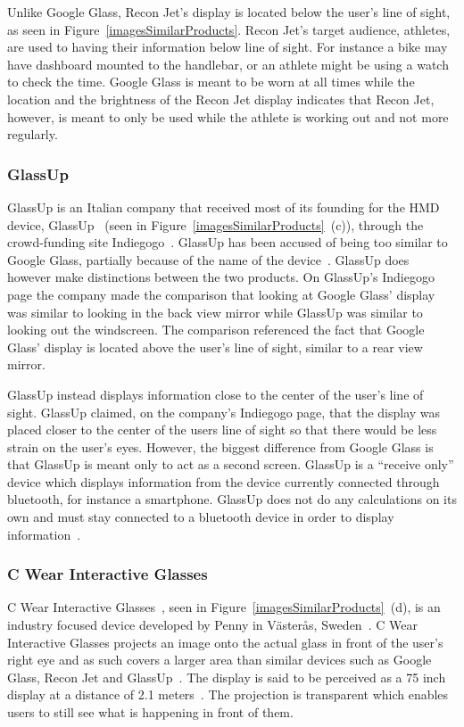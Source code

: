 Unlike Google Glass, Recon Jet's display is located below the user's line of sight, as seen in Figure~\ref{imagesSimilarProducts}. Recon Jet's target audience, athletes, are used to having their information below line of sight. For instance a bike may have dashboard mounted to the handlebar, or an athlete might be using a watch to check the time. Google Glass is meant to be worn at all times while the location and the brightness of the Recon Jet display indicates that Recon Jet, however, is meant to only be used while the athlete is working out and not more regularly.

\subsubsection{GlassUp}

GlassUp is an Italian company that received most of its founding for the HMD device, GlassUp~\cite{glassUp} (seen in Figure~\ref{imagesSimilarProducts}~(c)), through the crowd-funding site Indiegogo~\cite{glassUpIndiegogo}. GlassUp has been accused of being too similar to Google Glass, partially because of the name of the device~\cite{glassUpLegal}. GlassUp does however make distinctions between the two products. On GlassUp's Indiegogo page the company made the comparison that looking at Google Glass' display was similar to looking in the back view mirror while GlassUp was similar to looking out the windscreen. The comparison referenced the fact that Google Glass' display is located above the user's line of sight, similar to a rear view mirror.

GlassUp instead displays information close to the center of the user's line of sight. GlassUp claimed, on the company's Indiegogo page, that the display was placed closer to the center of the users line of sight so that there would be less strain on the user's eyes. However, the biggest difference from Google Glass is that GlassUp is meant only to act as a second screen. GlassUp is a ``receive only'' device which displays information from the device currently connected through bluetooth, for instance a smartphone. GlassUp does not do any calculations on its own and must stay connected to a bluetooth device in order to display information~\cite{glassUpIndiegogo}.

\subsubsection{C Wear Interactive Glasses}

C Wear Interactive Glasses~\cite{penny}, seen in Figure~\ref{imagesSimilarProducts}~(d), is an industry focused device developed by Penny in V{\"a}ster{\aa}s, Sweden~\cite{pennyCompany}. C Wear Interactive Glasses projects an image onto the actual glass in front of the user's right eye and as such covers a larger area than similar devices such as Google Glass, Recon Jet and GlassUp~\cite{pennyDisplay}. The display is said to be perceived as a 75 inch display at a distance of 2.1 meters~\cite{pennyProducts}. The projection is transparent which enables users to still see what is happening in front of them.

